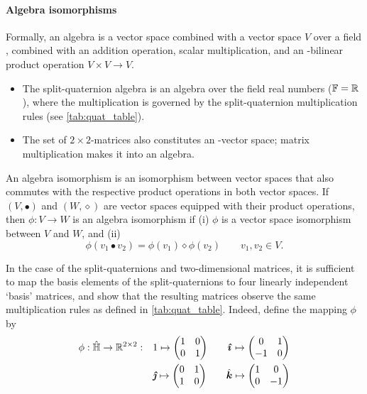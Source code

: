 \paragraph{Algebra isomorphisms} Formally, an algebra is a vector space combined with a vector space $V$ over a field \field, combined with an addition operation, scalar multiplication, and an \field-bilinear product operation $V\times V \to V$. \cite{Schuller2014}
\begin{itemize}
    \item The split-quaternion algebra is an algebra over the field real numbers ($\mathbb{F} = \mathbb{R}$), where the multiplication is governed by the split-quaternion multiplication rules (see \cref{tab:quat_table}).
    \item The set of $2\times2$-matrices also constitutes an \real-vector space; matrix multiplication makes it into an algebra.
\end{itemize}

An algebra isomorphism is an isomorphism between vector spaces that also commutes with the respective product operations in both vector spaces. If $(V, \bullet)$ and $(W, \diamond)$ are vector spaces equipped with their product operations, then $\phi: V \to W$ is an algebra isomorphism if (i) $\phi$ is a vector space isomorphism between $V$ and $W$, and (ii) \cite{Lang2002}
$$ \phi(v_1 \bullet v_2) = \phi(v_1)\diamond\phi(v_2) \qquad v_1, v_2 \in V. $$

In the case of the split-quaternions and two-dimensional matrices, it is sufficient to map the basis elements of the split-quaternions to four linearly independent `basis' matrices, and show that the resulting matrices observe the same multiplication rules as defined in \cref{tab:quat_table}. Indeed, define the mapping $\phi$ by 
\begin{equation}
    \begin{split}
        \phi: \spquaternions \to \real^{2\times2}: \quad &  
         1 \mapsto  \mqty(1 & 0 \\ 0 & 1) \qquad
        \quati \mapsto  \mqty(0 & 1 \\  -1 & 0) \\
        & \quatj \mapsto  \mqty(0 & 1 \\  1 & 0)\qquad 
        \quatk \mapsto  \mqty(1 & 0 \\  0 & -1) \\
    \end{split}
    \label{eq:basis_elements}
\end{equation}


